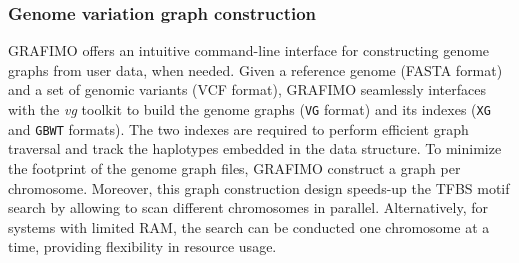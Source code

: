 \documentclass[a4paper, titlepage, openright]{book}
\newcommand{\grafimo}{GRAFIMO\xspace}
\begin{document}
\subsubsection{Genome variation graph construction}
\grafimo offers an intuitive command-line interface for constructing genome graphs from user data, when needed. Given a reference genome (FASTA format) and a set of genomic variants (VCF format), \grafimo seamlessly interfaces with the \emph{vg} toolkit to build the genome graphs (\texttt{VG} format) and its indexes (\texttt{XG} \citep{garrison2018variation} and \texttt{GBWT} \citep{siren2020haplotype, novak2017graph} formats). The two indexes are required to perform efficient graph traversal and track the haplotypes embedded in the data structure. To minimize the footprint of the genome graph files, \grafimo construct a graph per chromosome. Moreover, this graph construction design speeds-up the TFBS motif search by allowing to scan different chromosomes in parallel. Alternatively, for systems with limited RAM, the search can be conducted one chromosome at a time, providing flexibility in resource usage.

%
%
\end{document}
